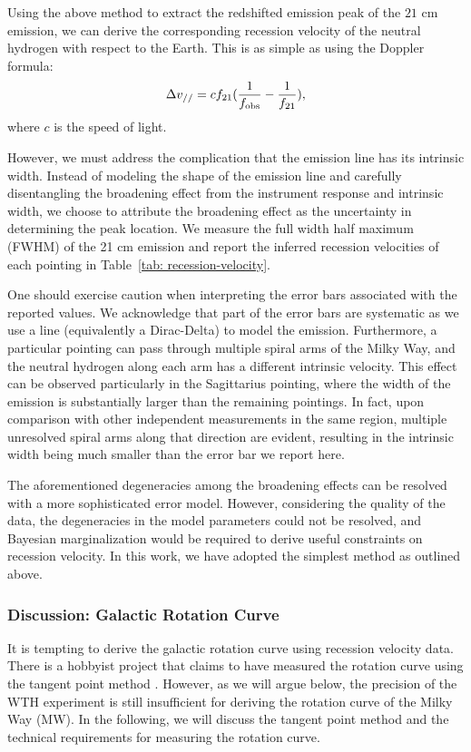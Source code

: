 \documentclass[12pt]{article}
\begin{document}
    Using the above method to extract the redshifted emission peak of the $21$ cm emission, we can derive the corresponding recession velocity of the neutral hydrogen with respect to the Earth. 
    This is as simple as using the Doppler formula:
    \begin{equation}
        \Delta v_{//} = c f_{\rm 21} (\frac{1}{f_{\rm obs}} - \frac{1}{f_{\rm 21}}),
    \end{equation}
    where $c$ is the speed of light. 
    
    However, we must address the complication that the emission line has its intrinsic width. Instead of modeling the shape of the emission line and carefully disentangling the broadening effect from the instrument response and intrinsic width, we choose to attribute the broadening effect as the uncertainty in determining the peak location. We measure the full width half maximum (FWHM) of the 21 cm emission and report the inferred recession velocities of each pointing in Table~\ref{tab: recession-velocity}.

    One should exercise caution when interpreting the error bars associated with the reported values. We acknowledge that part of the error bars are systematic as we use a line (equivalently a Dirac-Delta) to model the emission. Furthermore, a particular pointing can pass through multiple spiral arms of the Milky Way, and the neutral hydrogen along each arm has a different intrinsic velocity. This effect can be observed particularly in the Sagittarius pointing, where the width of the emission is substantially larger than the remaining pointings. In fact, upon comparison with other independent measurements in the same region, multiple unresolved spiral arms along that direction are evident, resulting in the intrinsic width being much smaller than the error bar we report here.
    
    The aforementioned degeneracies among the broadening effects can be resolved with a more sophisticated error model. However, considering the quality of the data, the degeneracies in the model parameters could not be resolved, and Bayesian marginalization would be required to derive useful constraints on recession velocity. In this work, we have adopted the simplest method as outlined above.

    \subsubsection{Discussion: Galactic Rotation Curve} \label{sect: rotation-curve}
    It is tempting to derive the galactic rotation curve using recession velocity data. There is a hobbyist project that claims to have measured the rotation curve using the tangent point method \cite{physicsOpenLab-project,PhysicsOpenLab-rotation-curve}. However, as we will argue below, the precision of the WTH experiment is still insufficient for deriving the rotation curve of the Milky Way (MW). In the following, we will discuss the tangent point method and the technical requirements for measuring the rotation curve.
\end{document}
